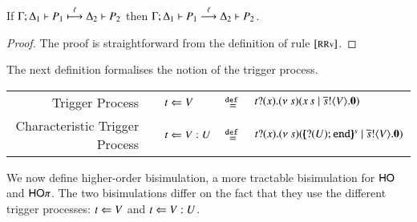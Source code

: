 \begin{lemma}[Invariant]\label{l:invariant}
	If $\Gamma; \Delta_1 \vdash P_1 \stackrel{\ell}{\longmapsto} \Delta_2 \vdash P_2$
	then $\Gamma; \Delta_1 \vdash P_1 \stackrel{\ell}{\longrightarrow} \Delta_2 \vdash P_2$.
\end{lemma}

\begin{proof}
	The proof is straightforward from the definition of rule ${\footnotesize [\textrm{RRv}]}$.
\end{proof}


The next definition formalises the notion of the trigger process.
%
\begin{definition}\rm
	\begin{center}
		\begin{tabular}{rclcl}
			Trigger Process & & $t \Leftarrow V$ &$\stackrel{\mathtt{def}\ }{=}$& $t ? (x) . (\nu\ s)(x\,s \;|\; \overline{s} ! \langle V \rangle . \mathbf{0})$\\
			Characteristic Trigger Process & & $t \Leftarrow V:U$ &$\stackrel{\mathtt{def}\ }{=}$& $t ? (x) . (\nu\ s)([\!\!(? (U) ; \mathtt{end})\!\!]^{s} \;|\; \overline{s} ! \langle V \rangle . \mathbf{0})$
		\end{tabular}
	\end{center}
\end{definition}

 We now define 
higher-order bisimulation, 
a more tractable bisimulation for $\mathsf{HO}$ and $\mathsf{HO}\pi$.
The two bisimulations differ on the fact that
they use the different 
trigger processes: $t \Leftarrow V$ and $t \Leftarrow V:U$.


